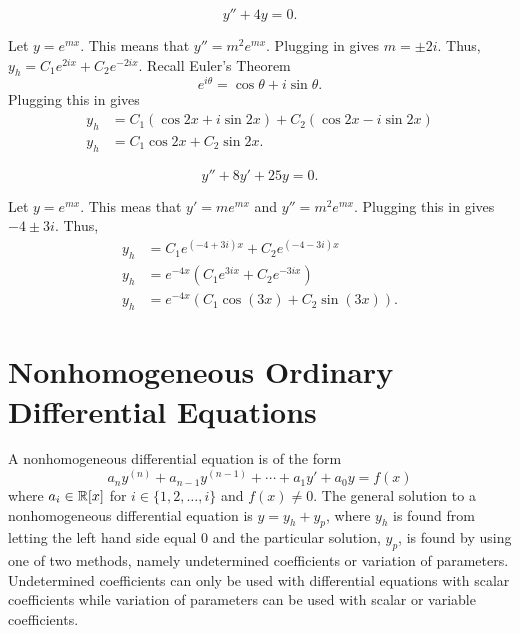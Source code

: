 \begin{example}
   $$ y''+4y = 0.$$
\end{example}
\begin{soln}
    Let $y=e^{mx}$. This means that $y'' = m^2e^{mx}$. Plugging in gives
    $m= \pm 2i$. Thus, $y_h = C_1e^{2ix} + C_2e^{-2ix}$. Recall 
    \alert{Euler's Theorem} $$e^{i\theta} = \cos \theta + i\sin \theta.$$
    Plugging this in gives
    \begin{align*}
        y_h &= C_1(\cos 2x + i\sin 2x) + C_2(\cos 2x  -i\sin  2x) \\
        y_h &= C_1\cos 2x + C_2 \sin 2x.
    \end{align*}
\end{soln}
\begin{example}
$$y''+8y'+25y = 0.$$
\end{example}
\begin{soln}
    Let $y=e^{mx}$. This meas that $y' = me^{mx}$ and $y'' = m^2e^{mx}$.
    Plugging this in gives $-4\pm 3i$. Thus, 
    \begin{align*}
        y_h &= C_1e^{(-4+3i)x} + C_2e^{(-4-3i)x} \\
        y_h &= e^{-4x}\left(C_1e^{3ix} + C_2e^{-3ix} \right) \\
        y_h &= e^{-4x}\left(C_1 \cos(3x) + C_2 \sin (3x) \right).
    \end{align*}
\end{soln}

\section{Nonhomogeneous Ordinary Differential Equations}
A \alert{nonhomogeneous} differential equation is of the form
$$a_ny^{(n)} +a_{n-1}y^{(n-1)}+\cdots+a_1y'+a_0y = f(x)$$
where $a_i \in \mathbb R[x]$ for $i \in \{1,2,\dots,i\}$ and $f(x) \neq 0$. 
The general solution to a nonhomogeneous
differential equation is $y = y_h+y_p$, where $y_h$ is found from letting
the left hand side equal $0$ and the particular solution, $y_p$, is found
by using one of two methods, namely \alert{undetermined coefficients} or
\alert{variation of parameters}. Undetermined coefficients can only be used
with differential equations with scalar coefficients while variation of parameters
can be used with scalar or variable coefficients.

